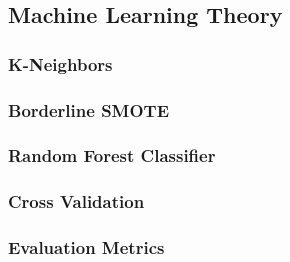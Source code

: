 \subsection{Machine Learning Theory}


\subsubsection{K-Neighbors}


\subsubsection{Borderline SMOTE}


\subsubsection{Random Forest Classifier}


\subsubsection{Cross Validation}


\subsubsection{Evaluation Metrics}





